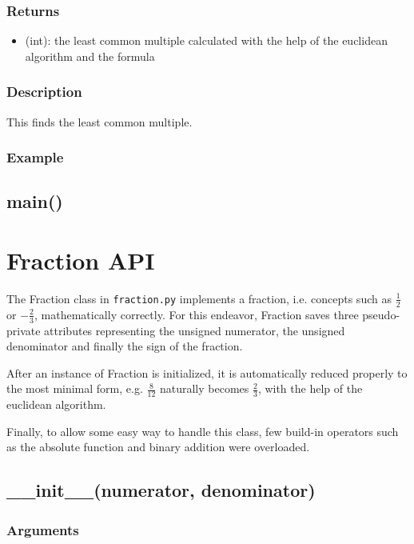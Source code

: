 \documentclass[refman]{scrartcl}
\begin{document}
\subsubsection*{Returns}

\begin{itemize}
  \item (int): the least common multiple calculated with the help of the euclidean algorithm and the formula
\end{itemize}

\subsubsection*{Description}

This finds the least common multiple.

\subsubsection*{Example}

\subsection{main()}

\section{Fraction API}

The Fraction class in \texttt{fraction.py} implements a fraction, i.e. concepts such as \(\frac{1}{2}\) or \(-\frac{2}{3}\), mathematically correctly. For this endeavor, Fraction saves three pseudo-private attributes representing the unsigned numerator, the unsigned denominator and finally the sign of the fraction.

After an instance of Fraction is initialized, it is automatically reduced properly to the most minimal form, e.g. \(\frac{8}{12}\) naturally becomes \(\frac{2}{3}\), with the help of the euclidean algorithm.

Finally, to allow some easy way to handle this class, few build-in operators such as the absolute function and binary addition were overloaded.

\subsection{\_\_init\_\_(numerator, denominator)}

\subsubsection*{Arguments}
\end{document}

